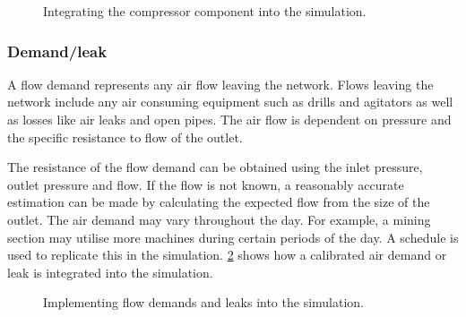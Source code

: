 		\begin{figure}[h]
			\centering
			\caption{Integrating the compressor component into the simulation.}
			\label{fig: Compressor models}
		\end{figure}		

		\subsubsection{Demand/leak}
			A flow demand represents any air flow leaving the network. Flows leaving the network include any air consuming equipment such as drills and agitators as well as losses like air leaks and open pipes. The air flow is dependent on pressure and the specific resistance to flow of the outlet. 
			\par 
			The resistance of the flow demand can be obtained using the inlet pressure, outlet pressure and flow. If the flow is not known, a reasonably accurate estimation can be made by calculating the expected flow from the size of the outlet. The air demand may vary throughout the day. For example, a mining section may utilise more machines during certain periods of the day. A schedule is used to replicate this in the simulation. \cref{fig: Demand component} shows how a calibrated air demand or leak is integrated into the simulation.
			\begin{figure}[h]
				\centering
				\caption{Implementing flow demands and leaks into the simulation.} 
				\label{fig: Demand component}
			\end{figure}
